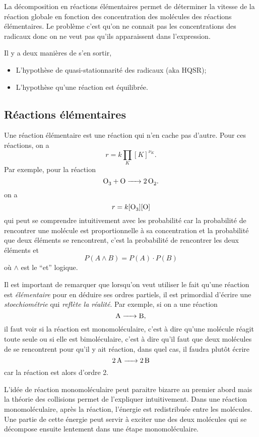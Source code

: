 La décomposition en réactions élémentaires permet de déterminer
la vitesse de la réaction globale en fonction des concentration
des molécules des réactions élémentaires.
Le problème c'est qu'on ne connait pas les concentrations
des radicaux donc on ne veut pas qu'ils apparaissent dans l'expression.

Il y a deux manières de s'en sortir,
\begin{itemize}
  \item L'hypothèse de quasi-stationnarité des radicaux (aka HQSR);
  \item L'hypothèse qu'une réaction est équilibrée.
\end{itemize}

\subsection{Réactions élémentaires}
Une réaction élémentaire est une réaction qui n'en cache pas d'autre.
Pour ces réactions, on a
\[ r = k \prod_K [K]^{\nu_K}. \]
Par exemple, pour la réaction
\[ \ce{O3 + O -> 2O2}. \]
on a
\[ r = k[\ce{O3}][\ce{O}] \]
qui peut se comprendre intuitivement avec les probabilité car
la probabilité de rencontrer une molécule est proportionnelle à
sa concentration et la probabilité que deux éléments se rencontrent,
c'est la probabilité de rencontrer les deux éléments et
\[ P(A \land B) = P(A) \cdot P(B) \]
où $\land$ est le ``et'' logique.

\begin{myrem}
  Il est important de remarquer que lorsqu'on veut utiliser
  le fait qu'une réaction est \emph{élémentaire} pour en déduire ses
  ordres partiels, il est primordial d'écrire une \emph{stoechiométrie}
  qui \emph{reflète la réalité}.
  Par exemple, si on a une réaction
  \[ \ce{A -> B}, \]
  il faut voir si la réaction est monomoléculaire, c'est à dire qu'une
  molécule  réagit toute seule ou si elle est bimoléculaire,
  c'est à dire qu'il faut que deux molécules de  se rencontrent
  pour qu'il y ait réaction,
  dans quel cas, il faudra plutôt écrire
  \[ \ce{2A -> 2B} \]
  car la réaction est alors d'ordre 2.

  L'idée de réaction monomoléculaire peut paraitre bizarre au premier
  abord mais la théorie des collisions permet de l'expliquer intuitivement.
  Dans une réaction monomoléculaire, après la réaction,
  l'énergie est redistribuée entre les molécules.
  Une partie de cette énergie peut servir à exciter une des deux molécules qui
  se décompose ensuite lentement dans une étape monomoléculaire.
\end{myrem}

